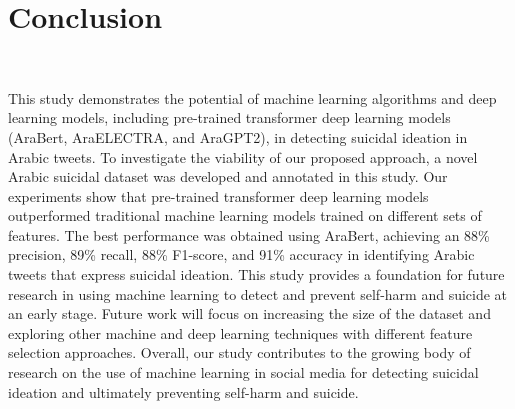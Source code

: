 \documentclass[sn-mathphys,Numbered]{sn-jnl}%
\begin{document}
\section{Conclusion}
~\label{Sec:conclusion} 
 
This study demonstrates the potential of machine learning algorithms and deep learning models, including pre-trained transformer deep learning models (AraBert, AraELECTRA, and AraGPT2), in detecting suicidal ideation in Arabic tweets. To investigate the viability of our proposed approach, a novel Arabic suicidal dataset was developed and annotated in this study. Our experiments show that pre-trained transformer deep learning models outperformed traditional machine learning models trained on different sets of features. The best performance was obtained using AraBert, achieving an 88\% precision, 89\% recall, 88\% F1-score, and 91\% accuracy in identifying Arabic tweets that express suicidal ideation. This study provides a foundation for future research in using machine learning to detect and prevent self-harm and suicide at an early stage. Future work will focus on increasing the size of the dataset and exploring other machine and deep learning techniques with different feature selection approaches. Overall, our study contributes to the growing body of research on the use of machine learning in social media for detecting suicidal ideation and ultimately preventing self-harm and suicide.




\end{document}
